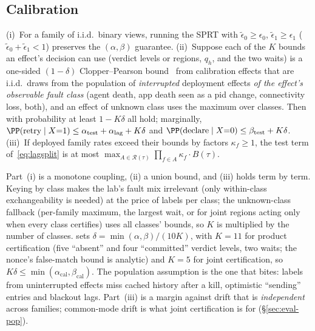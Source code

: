 \subsection{Calibration}
\label{sec:theory-cal}
\begin{lemma}
\label{lem:calib}
(i)~For a family of i.i.d.\ binary views, running the SPRT with $\tilde\epsilon_0\ge\epsilon_0$, $\tilde\epsilon_1\ge\epsilon_1$ ($\tilde\epsilon_0+\tilde\epsilon_1<1$) preserves the
$(\alpha,\beta)$ guarantee.
(ii)~Suppose each of the $K$ bounds an effect's decision can use (verdict levels or regions, $q_h$, and the two waits) is a one-sided $(1-\delta)$ Clopper--Pearson
bound~\cite{clopper1934use} from calibration effects that are i.i.d.\ draws from the population of \emph{interrupted} deployment effects \emph{of the effect's observable fault
class} (agent death, app death seen as a pid change, connectivity loss, both), and an effect of unknown class uses the maximum over classes. Then with probability
at least $1-K\delta$ all hold; marginally, $\PP(\text{retry}\mid X{=}1)\le\alpha_{\mathrm{test}}+\alpha_{\mathrm{lag}}+K\delta$ and $\PP(\text{declare}\mid X{=}0)\le\beta_{\mathrm{test}}+K\delta$.
(iii)~If deployed family rates exceed their bounds by factors $\kappa_f\ge1$, the test term of~\eqref{eq:lagsplit} is at most $\max_{A\in\mathcal R(\tau)}\prod_{f\in A}\kappa_f\cdot B(\tau)$.
\end{lemma}
Part~(i) is a monotone coupling, (ii) a union bound, and (iii) holds term by term. Keying by class makes the lab's fault mix irrelevant (only within-class exchangeability is
needed) at the price of labels per class; the unknown-class fallback (per-family maximum, the largest wait, or for joint regions acting only when every class certifies)
uses all classes' bounds, so $K$ is multiplied by the number of classes. \sys sets $\delta=\min(\alpha,\beta)/(10K)$, with $K{=}11$ for product certification (five ``absent'' and four ``committed''
verdict levels, two waits; the nonce's false-match bound is analytic) and $K{=}5$ for joint certification, so $K\delta\le\min(\alpha_{\mathrm{cal}},\beta_{\mathrm{cal}})$. The population assumption is the one that bites:
labels from uninterrupted effects miss cached history after a kill, optimistic ``sending'' entries and blackout lags. Part~(iii) is a margin against drift that is \emph{independent}
across families; common-mode drift is what joint certification is for (\S\ref{sec:eval-pop}).

